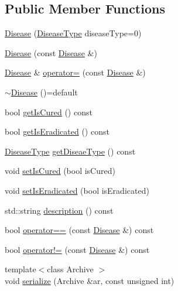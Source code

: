 \subsection*{Public Member Functions}
\begin{DoxyCompactItemize}
\item 
\hyperlink{classpan_1_1_disease_a5be3dc7f12596a1bc6221cad3faf5245}{Disease} (\hyperlink{namespacepan_a48851b51b0aef3f0e1be80df5031d9d7}{Disease\+Type} disease\+Type=0)
\item 
\hyperlink{classpan_1_1_disease_a887d5b552c8c868211101b3ba349239b}{Disease} (const \hyperlink{classpan_1_1_disease}{Disease} \&)
\item 
\hyperlink{classpan_1_1_disease}{Disease} \& \hyperlink{classpan_1_1_disease_a7f828d68e1c0cccc7bffcef529ab547f}{operator=} (const \hyperlink{classpan_1_1_disease}{Disease} \&)
\item 
\hyperlink{classpan_1_1_disease_a0bb1181ae59b3d54f6968a1260726102}{$\sim$\+Disease} ()=default
\item 
bool \hyperlink{classpan_1_1_disease_a7a39321c5b39468d2ac0cd8ff2abafc2}{get\+Is\+Cured} () const
\item 
bool \hyperlink{classpan_1_1_disease_afe3ad8194b4bfa1fd25eb833ba8ade10}{get\+Is\+Eradicated} () const
\item 
\hyperlink{namespacepan_a48851b51b0aef3f0e1be80df5031d9d7}{Disease\+Type} \hyperlink{classpan_1_1_disease_adf3b7990f5986899944ec7b82131278d}{get\+Diseae\+Type} () const
\item 
void \hyperlink{classpan_1_1_disease_ac6363817626fee5081df5ff3c4be2b68}{set\+Is\+Cured} (bool is\+Cured)
\item 
void \hyperlink{classpan_1_1_disease_a21c70c565e8a186f699696159231a767}{set\+Is\+Eradicated} (bool is\+Eradicated)
\item 
std\+::string \hyperlink{classpan_1_1_disease_a56ea3e8918baf355ad2d1aa253fd9f65}{description} () const
\item 
bool \hyperlink{classpan_1_1_disease_a8f0c036eba650a230abb91bd8334d150}{operator==} (const \hyperlink{classpan_1_1_disease}{Disease} \&) const
\item 
bool \hyperlink{classpan_1_1_disease_ae699486ffe1bf9e35d1847bc1b8d2617}{operator!=} (const \hyperlink{classpan_1_1_disease}{Disease} \&) const
\item 
{\footnotesize template$<$class Archive $>$ }\\void \hyperlink{classpan_1_1_disease_a6fcfb95df953d991c96188ea2966583a}{serialize} (Archive \&ar, const unsigned int)
\end{DoxyCompactItemize}
